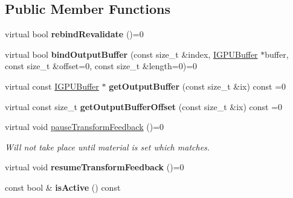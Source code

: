 \subsection*{Public Member Functions}
\begin{DoxyCompactItemize}
\item 
virtual bool {\bfseries rebind\+Revalidate} ()=0\hypertarget{classirr_1_1video_1_1ITransformFeedback_ac4198f709fd60c95d20240bd15659bd8}{}\label{classirr_1_1video_1_1ITransformFeedback_ac4198f709fd60c95d20240bd15659bd8}

\item 
virtual bool {\bfseries bind\+Output\+Buffer} (const size\+\_\+t \&index, \hyperlink{classirr_1_1video_1_1IGPUBuffer}{I\+G\+P\+U\+Buffer} $\ast$buffer, const size\+\_\+t \&offset=0, const size\+\_\+t \&length=0)=0\hypertarget{classirr_1_1video_1_1ITransformFeedback_aca2a5db351c04c4a5146c7ceb6453e6d}{}\label{classirr_1_1video_1_1ITransformFeedback_aca2a5db351c04c4a5146c7ceb6453e6d}

\item 
virtual const \hyperlink{classirr_1_1video_1_1IGPUBuffer}{I\+G\+P\+U\+Buffer} $\ast$ {\bfseries get\+Output\+Buffer} (const size\+\_\+t \&ix) const  =0\hypertarget{classirr_1_1video_1_1ITransformFeedback_adec2da6de05f7cecff7fcb594e30079f}{}\label{classirr_1_1video_1_1ITransformFeedback_adec2da6de05f7cecff7fcb594e30079f}

\item 
virtual const size\+\_\+t {\bfseries get\+Output\+Buffer\+Offset} (const size\+\_\+t \&ix) const  =0\hypertarget{classirr_1_1video_1_1ITransformFeedback_aecd8e58019d0ee005229af43648c97c2}{}\label{classirr_1_1video_1_1ITransformFeedback_aecd8e58019d0ee005229af43648c97c2}

\item 
virtual void \hyperlink{classirr_1_1video_1_1ITransformFeedback_ad6b5bfc841c37ea0c52eb40cf30b61c6}{pause\+Transform\+Feedback} ()=0\hypertarget{classirr_1_1video_1_1ITransformFeedback_ad6b5bfc841c37ea0c52eb40cf30b61c6}{}\label{classirr_1_1video_1_1ITransformFeedback_ad6b5bfc841c37ea0c52eb40cf30b61c6}

\begin{DoxyCompactList}\small\item\em Will not take place until material is set which matches. \end{DoxyCompactList}\item 
virtual void {\bfseries resume\+Transform\+Feedback} ()=0\hypertarget{classirr_1_1video_1_1ITransformFeedback_a455016a7824228fc65eeb995e0bed16e}{}\label{classirr_1_1video_1_1ITransformFeedback_a455016a7824228fc65eeb995e0bed16e}

\item 
const bool \& {\bfseries is\+Active} () const \hypertarget{classirr_1_1video_1_1ITransformFeedback_accceeb166b48617c911c0b6694e7c67c}{}\label{classirr_1_1video_1_1ITransformFeedback_accceeb166b48617c911c0b6694e7c67c}

\end{DoxyCompactItemize}
